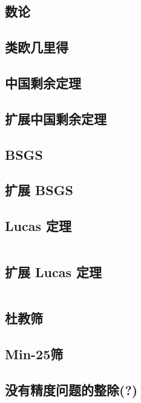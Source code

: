 \documentclass[12pt, a4paper, oneside]{ctexart}
\begin{document}
\begin{multicols}{2}
        \section{数论}
        \subsection{类欧几里得}
        
        \subsection{中国剩余定理}
        
        \subsection{扩展中国剩余定理}
        
        \subsection{BSGS}
        
        \subsection{扩展 BSGS}
        
        \subsection{Lucas 定理}
        \inputminted{cpp}{src/number theory/lucas.cpp}
        \subsection{扩展 Lucas 定理}
        \inputminted{cpp}{src/number theory/exlucas.cpp}
        \subsection{杜教筛}
        
        \subsection{Min-25筛}
        
        \subsection{没有精度问题的整除(?)}
        \inputminted{cpp}{src/number theory/div.cpp}


\end{multicols}
\end{document}
